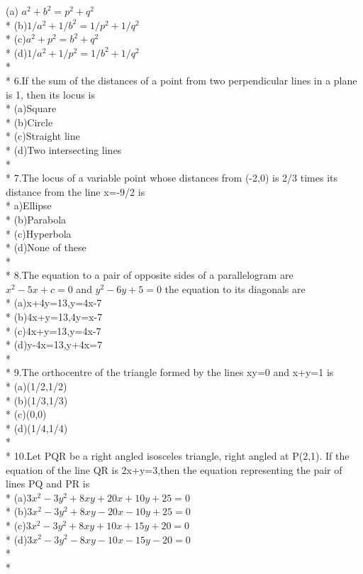 \documentclass{article}
\begin{document}
(a) $a^2+b^2=p^2+q^2$\\*
(b)$1/a^2+1/b^2=1/p^2+1/q^2$\\*
(c)$a^2+p^2=b^2+q^2$\\*
(d)$1/a^2+1/p^2=1/b^2+1/q^2$\\*\\*
6.\enspace If the sum of the distances of a point from two perpendicular lines in a plane is 1, then its locus is\\*
(a)\enspace Square\\*
(b)\enspace Circle\\*
(c)\enspace Straight line\\*
(d)\enspace Two intersecting lines\\*\\*
7.\enspace The locus of a variable point whose distances from (-2,0) is 2/3 times its distance from the line x=-9/2 is\\*
a)\enspace Ellipse\\*
(b)\enspace Parabola\\*
(c)\enspace Hyperbola\\*
(d)\enspace None of these\\*\\*
8.\enspace The equation to a pair of opposite sides of a parallelogram are $x^2-5x+c=0$ and $y^2-6y+5=0$ the equation to its diagonals are\\*
(a)x+4y=13,y=4x-7\\*
(b)4x+y=13,4y=x-7\\*
(c)4x+y=13,y=4x-7\\*
(d)y-4x=13,y+4x=7\\*\\*
9.\enspace The orthocentre of the triangle formed by the lines xy=0 and x+y=1 is \\*
(a)(1/2,1/2)\\*
(b)(1/3,1/3)\\*
(c)(0,0)\\*
(d)(1/4,1/4)\\*\\*
10.\enspace Let PQR be a right angled isosceles triangle, right angled at  P(2,1). If the equation of the line QR is 2x+y=3,then the equation representing the pair of lines PQ and PR is\\*
(a)$3x^2-3y^2+8xy+20x+10y+25=0$\\*
(b)$3x^2-3y^2+8xy-20x-10y+25=0$\\*
(c)$3x^2-3y^2+8xy+10x+15y+20=0$\\*
(d)$3x^2-3y^2-8xy-10x-15y-20=0$\\*\\*
\end{document}
